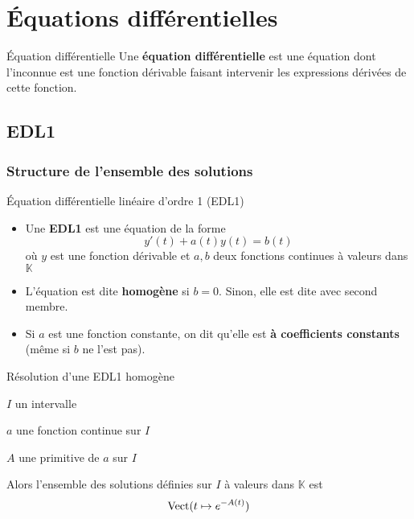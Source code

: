 \section{Équations différentielles}

    \begin{defi}{Équation différentielle}{}
	    Une \textbf{équation différentielle} est une équation dont l’inconnue est une fonction dérivable faisant intervenir les expressions dérivées de cette fonction.
    \end{defi}

\subsection{EDL1}

    \subsubsection{Structure de l’ensemble des solutions}

    \begin{defi}{Équation différentielle linéaire d’ordre 1 (EDL1)}{}
	    \begin{itemize}
		    \item Une \textbf{EDL1} est une équation de la forme 
            \[ y'(t) + a(t)y(t) = b(t)\]
             où $y$ est une fonction dérivable et $a,b$ deux fonctions continues à valeurs dans $\mathbb{K}$
		    \item L’équation est dite \textbf{homogène} si $b = 0$. Sinon, elle est dite avec second membre.
		    \item Si $a$ est une fonction constante, on dit qu’elle est \textbf{à coefficients constants} (même si $b$ ne l’est pas).
	    \end{itemize}
    \end{defi}

    \begin{theo}{Résolution d’une EDL1 homogène}{}
        \begin{soient}
            \item $I$ un intervalle
            \item $a$ une fonction continue sur $I$
            \item $A$ une primitive de $a$ sur $I$
        \end{soient}
        Alors l’ensemble des solutions définies sur $I$ à valeurs dans $\mathbb{K}$ est 
        \[ \operatorname{Vect}(t \mapsto e^{-A(t)}) \]
    \end{theo}


